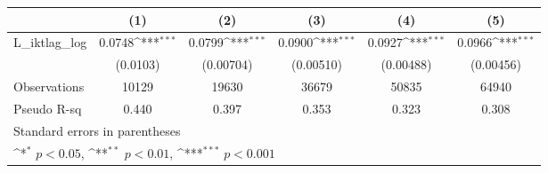 {
\def\sym#1{\ifmmode^{#1}\else\(^{#1}\)\fi}
\begin{tabular}{l*{5}{c}}
\hline\hline
                &\multicolumn{1}{c}{(1)}         &\multicolumn{1}{c}{(2)}         &\multicolumn{1}{c}{(3)}         &\multicolumn{1}{c}{(4)}         &\multicolumn{1}{c}{(5)}         \\
\hline
L\_iktlag\_log    &   0.0748\sym{***}&   0.0799\sym{***}&   0.0900\sym{***}&   0.0927\sym{***}&   0.0966\sym{***}\\
                & (0.0103)         &(0.00704)         &(0.00510)         &(0.00488)         &(0.00456)         \\
\hline
Observations    &    10129         &    19630         &    36679         &    50835         &    64940         \\
Pseudo R-sq     &    0.440         &    0.397         &    0.353         &    0.323         &    0.308         \\
\hline\hline
\multicolumn{6}{l}{\footnotesize Standard errors in parentheses}\\
\multicolumn{6}{l}{\footnotesize \sym{*} \(p<0.05\), \sym{**} \(p<0.01\), \sym{***} \(p<0.001\)}\\
\end{tabular}
}
